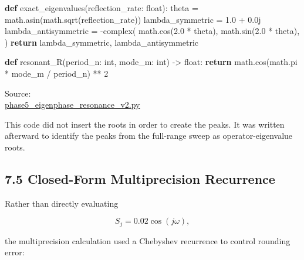 \documentclass[
  10pt,
  a4paper,
]{article}
\newenvironment{Shaded}{}{}
\newcommand{\BuiltInTok}[1]{\textcolor[rgb]{0.00,0.50,0.00}{#1}}
\newcommand{\ControlFlowTok}[1]{\textcolor[rgb]{0.00,0.44,0.13}{\textbf{#1}}}
\newcommand{\DecValTok}[1]{\textcolor[rgb]{0.25,0.63,0.44}{#1}}
\newcommand{\FloatTok}[1]{\textcolor[rgb]{0.25,0.63,0.44}{#1}}
\newcommand{\KeywordTok}[1]{\textcolor[rgb]{0.00,0.44,0.13}{\textbf{#1}}}
\newcommand{\NormalTok}[1]{#1}
\newcommand{\OperatorTok}[1]{\textcolor[rgb]{0.40,0.40,0.40}{#1}}
\newcommand{\OtherTok}[1]{\textcolor[rgb]{0.00,0.44,0.13}{#1}}
\begin{document}
\begin{Shaded}
\begin{Highlighting}[]
\KeywordTok{def}\NormalTok{ exact\_eigenvalues(reflection\_rate: }\BuiltInTok{float}\NormalTok{):}
\NormalTok{    theta }\OperatorTok{=}\NormalTok{ math.asin(math.sqrt(reflection\_rate))}
\NormalTok{    lambda\_symmetric }\OperatorTok{=} \FloatTok{1.0} \OperatorTok{+} \OtherTok{0.0j}
\NormalTok{    lambda\_antisymmetric }\OperatorTok{=} \OperatorTok{{-}}\BuiltInTok{complex}\NormalTok{(}
\NormalTok{        math.cos(}\FloatTok{2.0} \OperatorTok{*}\NormalTok{ theta),}
\NormalTok{        math.sin(}\FloatTok{2.0} \OperatorTok{*}\NormalTok{ theta),}
\NormalTok{    )}
    \ControlFlowTok{return}\NormalTok{ lambda\_symmetric, lambda\_antisymmetric}


\KeywordTok{def}\NormalTok{ resonant\_R(period\_n: }\BuiltInTok{int}\NormalTok{, mode\_m: }\BuiltInTok{int}\NormalTok{) }\OperatorTok{{-}\textgreater{}} \BuiltInTok{float}\NormalTok{:}
    \ControlFlowTok{return}\NormalTok{ math.cos(math.pi }\OperatorTok{*}\NormalTok{ mode\_m }\OperatorTok{/}\NormalTok{ period\_n) }\OperatorTok{**} \DecValTok{2}
\end{Highlighting}
\end{Shaded}

Source:\\
\href{../20260717/phase5_eigenphase_resonance_v2.py\#L74-L103}{phase5\_eigenphase\_resonance\_v2.py}

This code did not insert the roots in order to create the peaks. It was
written afterward to identify the peaks from the full-range sweep as
operator-eigenvalue roots.

\subsection{7.5 Closed-Form Multiprecision
Recurrence}\label{closed-form-multiprecision-recurrence}

Rather than directly evaluating

\[
S_j=0.02\cos(j\omega),
\]

the multiprecision calculation used a Chebyshev recurrence to control
rounding error:
\end{document}
